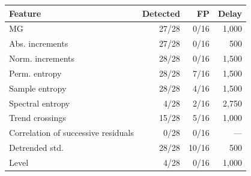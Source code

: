 \begin{tabular}{lrrr}
\toprule
Feature & Detected & FP & Delay \\
\midrule
MG & 27/28 & 0/16 & 1,000 \\
Abs. increments & 27/28 & 0/16 & 500 \\
Norm. increments & 28/28 & 0/16 & 1,500 \\
Perm. entropy & 28/28 & 7/16 & 1,500 \\
Sample entropy & 28/28 & 4/16 & 1,500 \\
Spectral entropy & 4/28 & 2/16 & 2,750 \\
Trend crossings & 15/28 & 5/16 & 1,000 \\
Correlation of successive residuals & 0/28 & 0/16 & --- \\
Detrended std. & 28/28 & 10/16 & 500 \\
Level & 4/28 & 0/16 & 1,000 \\
\bottomrule
\end{tabular}
